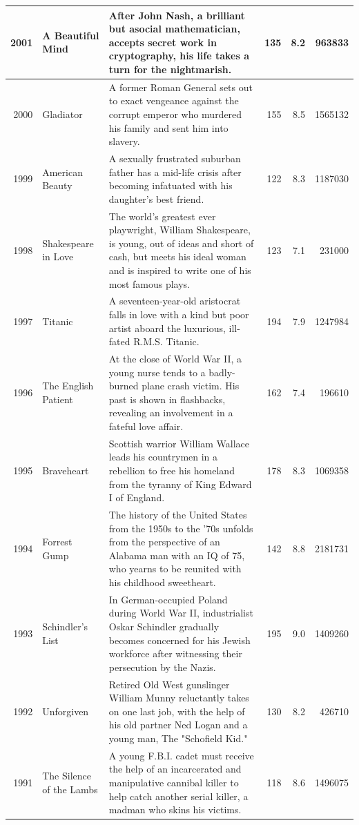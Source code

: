 \documentclass[
]{book}
\begin{document}
\begin{tabular}{r|l|l|r|r|r}
\hline
2001 & A Beautiful Mind & After John Nash, a brilliant but asocial mathematician, accepts secret work in cryptography, his life takes a turn for the nightmarish. & 135 & 8.2 & 963833\\
\hline
2000 & Gladiator & A former Roman General sets out to exact vengeance against the corrupt emperor who murdered his family and sent him into slavery. & 155 & 8.5 & 1565132\\
\hline
1999 & American Beauty & A sexually frustrated suburban father has a mid-life crisis after becoming infatuated with his daughter's best friend. & 122 & 8.3 & 1187030\\
\hline
1998 & Shakespeare in Love & The world's greatest ever playwright, William Shakespeare, is young, out of ideas and short of cash, but meets his ideal woman and is inspired to write one of his most famous plays. & 123 & 7.1 & 231000\\
\hline
1997 & Titanic & A seventeen-year-old aristocrat falls in love with a kind but poor artist aboard the luxurious, ill-fated R.M.S. Titanic. & 194 & 7.9 & 1247984\\
\hline
1996 & The English Patient & At the close of World War II, a young nurse tends to a badly-burned plane crash victim. His past is shown in flashbacks, revealing an involvement in a fateful love affair. & 162 & 7.4 & 196610\\
\hline
1995 & Braveheart & Scottish warrior William Wallace leads his countrymen in a rebellion to free his homeland from the tyranny of King Edward I of England. & 178 & 8.3 & 1069358\\
\hline
1994 & Forrest Gump & The history of the United States from the 1950s to the '70s unfolds from the perspective of an Alabama man with an IQ of 75, who yearns to be reunited with his childhood sweetheart. & 142 & 8.8 & 2181731\\
\hline
1993 & Schindler's List & In German-occupied Poland during World War II, industrialist Oskar Schindler gradually becomes concerned for his Jewish workforce after witnessing their persecution by the Nazis. & 195 & 9.0 & 1409260\\
\hline
1992 & Unforgiven & Retired Old West gunslinger William Munny reluctantly takes on one last job, with the help of his old partner Ned Logan and a young man, The "Schofield Kid." & 130 & 8.2 & 426710\\
\hline
1991 & The Silence of the Lambs & A young F.B.I. cadet must receive the help of an incarcerated and manipulative cannibal killer to help catch another serial killer, a madman who skins his victims. & 118 & 8.6 & 1496075\\

\end{tabular}
\end{document}
